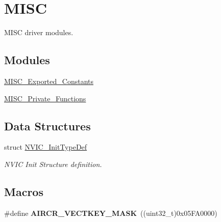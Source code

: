 \hypertarget{group___m_i_s_c}{\section{M\-I\-S\-C}
\label{group___m_i_s_c}
}


M\-I\-S\-C driver modules.  


\subsection*{Modules}
\begin{DoxyCompactItemize}
\item 
\hyperlink{group___m_i_s_c___exported___constants}{M\-I\-S\-C\-\_\-\-Exported\-\_\-\-Constants}
\item 
\hyperlink{group___m_i_s_c___private___functions}{M\-I\-S\-C\-\_\-\-Private\-\_\-\-Functions}
\end{DoxyCompactItemize}
\subsection*{Data Structures}
\begin{DoxyCompactItemize}
\item 
struct \hyperlink{struct_n_v_i_c___init_type_def}{N\-V\-I\-C\-\_\-\-Init\-Type\-Def}
\begin{DoxyCompactList}\small\item\em N\-V\-I\-C Init Structure definition. \end{DoxyCompactList}\end{DoxyCompactItemize}
\subsection*{Macros}
\begin{DoxyCompactItemize}
\item 
\hypertarget{group___m_i_s_c_gad6905141fba3a2d8d5570db40805dc6a}{\#define {\bfseries A\-I\-R\-C\-R\-\_\-\-V\-E\-C\-T\-K\-E\-Y\-\_\-\-M\-A\-S\-K}~((uint32\-\_\-t)0x05\-F\-A0000)}\label{group___m_i_s_c_gad6905141fba3a2d8d5570db40805dc6a}

\end{DoxyCompactItemize}
